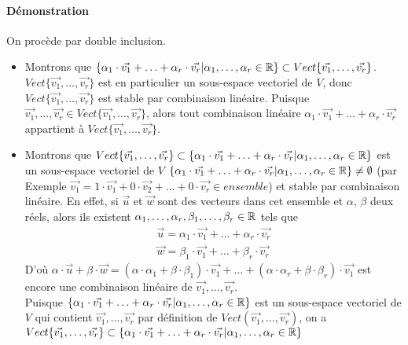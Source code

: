 \paragraph{Démonstration} On procède par double inclusion.
\begin{itemize}
  \item Montrons que $\{\alpha_1 \cdot \vec{v_1} + \ldots + \alpha_r \cdot \vec{v_r} | \alpha_1, \ldots, \alpha_r \in \mathbb{R} \} \subset Vect\{\vec{v_1}, \ldots, \vec{v_r}\}$. $Vect\{\vec{v_1}, \ldots, \vec{v_r}\}$ est en particulier un sous-espace vectoriel de $V$, donc $Vect\{\vec{v_1}, \ldots, \vec{v_r}\}$ est stable par combinaison linéaire. Puisque $\vec{v_1}, \ldots, \vec{v_r} \in Vect\{\vec{v_1}, \ldots, \vec{v_r}\}$, alors tout combinaison linéaire $\alpha_1 \cdot \vec{v_1} + \ldots + \alpha_r \cdot \vec{v_r}$ appartient à $Vect\{\vec{v_1}, \ldots, \vec{v_r}\}$.%
  
  \item Montrons que $Vect\{\vec{v_1}, \ldots, \vec{v_r}\} \subset \{\alpha_1 \cdot \vec{v_1} + \ldots + \alpha_r \cdot \vec{v_r} | \alpha_1, \ldots, \alpha_r \in \mathbb{R} \}$ est un sous-espace vectoriel de $V$ $\{\alpha_1 \cdot \vec{v_1} + \ldots + \alpha_r \cdot \vec{v_r} | \alpha_1, \ldots, \alpha_r \in \mathbb{R} \} \neq \emptyset$ (par Exemple $\vec{v_1} = 1 \cdot \vec{v_1} + 0 \cdot \vec{v_2} + \ldots + 0 \cdot \vec{v_r} \in ensemble$) et stable par combinaison linéaire. En effet, si $\vec{u}$ et $\vec{w}$ sont des vecteurs dans cet ensemble et $\alpha$, $\beta$ deux réels, alors ils existent $\alpha_1, \ldots, \alpha_r, \beta_1, \ldots, \beta_r \in \mathbb{R}$ tels que
    \begin{eqnarray*}
      \vec{u} = \alpha_1 \cdot \vec{v_1} + \ldots + \alpha_r \cdot \vec{v_r} \\
      \vec{w} = \beta_1 \cdot \vec{v_1} + \ldots + \beta_r \cdot \vec{v_r}
    \end{eqnarray*}
    D'où $\alpha \cdot \vec{u} + \beta \cdot \vec{w} = (\alpha \cdot \alpha_1 + \beta \cdot \beta_1)\cdot \vec{v_1} + \ldots + (\alpha \cdot \alpha_r + \beta \cdot \beta_r)\cdot \vec{v_1}$ est encore une combinaison linéaire de $\vec{v_1}, \ldots, \vec{v_r}$. \\
    Puisque $\{\alpha_1 \cdot \vec{v_1} + \ldots + \alpha_r \cdot \vec{v_r} | \alpha_1, \ldots, \alpha_r \in \mathbb{R} \}$ est un sous-espace vectoriel de $V$ qui contient $\vec{v_1}, \ldots, \vec{v_r}$ par définition de $Vect(\vec{v_1}, \ldots, \vec{v_r})$, on a $Vect\{\vec{v_1}, \ldots, \vec{v_r}\} \subset \{\alpha_1 \cdot \vec{v_1} + \ldots + \alpha_r \cdot \vec{v_r} | \alpha_1, \ldots, \alpha_r \in \mathbb{R} \}$
\end{itemize}

